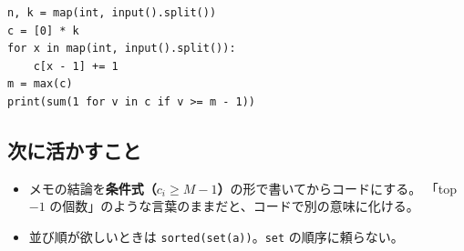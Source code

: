 \documentclass[a4paper]{article}
\begin{document}
\begin{verbatim}
n, k = map(int, input().split())
c = [0] * k
for x in map(int, input().split()):
    c[x - 1] += 1
m = max(c)
print(sum(1 for v in c if v >= m - 1))
\end{verbatim}

\subsection*{次に活かすこと}
\begin{itemize}
  \item メモの結論を\textbf{条件式（$c_i \geq M - 1$）}の形で書いてからコードにする。
    「top $-1$ の個数」のような言葉のままだと、コードで別の意味に化ける。
  \item 並び順が欲しいときは \verb|sorted(set(a))|。\verb|set| の順序に頼らない。
\end{itemize}
\end{document}
